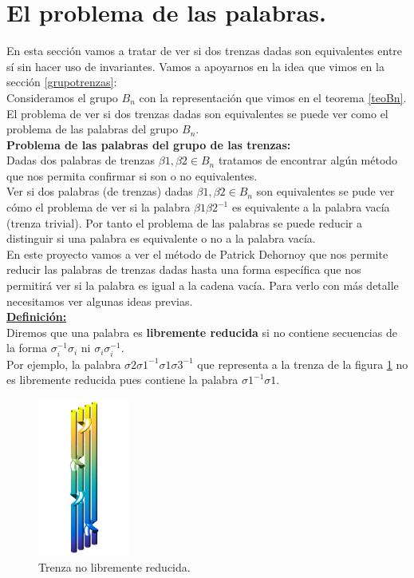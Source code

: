 \section{El problema de las palabras.}\label{deh}
En esta sección vamos a tratar de ver si dos trenzas dadas son equivalentes entre sí sin hacer uso de invariantes. Vamos a apoyarnos en la idea que vimos en la sección \ref{grupotrenzas}:\\

Consideramos el grupo $ B_{n} $ con la representación que vimos en el teorema \ref{teoBn}. El problema de ver si dos trenzas dadas son equivalentes se puede ver como el problema de las palabras del grupo $ B_{n} $.\\

\textbf{Problema de las palabras del grupo de las trenzas:}\\
Dadas dos palabras de trenzas $\beta1, \beta2 \in B_{n}$ tratamos de encontrar algún método que nos permita confirmar si son o no equivalentes. \\

Ver si dos palabras (de trenzas) dadas $\beta1, \beta2 \in B_{n}$ son equivalentes se pude ver cómo el problema de ver si la palabra $\beta1\beta2^{-1}$ es equivalente a la palabra vacía (trenza trivial). Por tanto el problema de las palabras se puede reducir a distinguir si una palabra es equivalente o no a la palabra vacía. \\

En este proyecto vamos a ver el método de Patrick Dehornoy que nos permite reducir las palabras de trenzas dadas hasta una forma específica que nos permitirá ver si la palabra es igual a la cadena vacía. Para verlo con más detalle necesitamos ver algunas ideas previas.\\

\underline{\textbf{Definición:}}\\
Diremos que una palabra es \textbf{libremente reducida} si no contiene secuencias de la forma $\sigma_{i}^{-1}\sigma_{i} $ ni $\sigma_{i}\sigma_{i}^{-1}$.\\

Por ejemplo, la palabra $\sigma2\sigma1^{-1}\sigma1\sigma3^{-1}$ que representa a la trenza de la figura \ref{deh1} no es libremente reducida pues contiene la palabra $\sigma1^{-1}\sigma1$.\\

	\begin{figure}[h!]
		\centering
		\includegraphics[width=3cm]{itrenzas/deh1.png}
		\caption{Trenza no libremente reducida.}
		\label{deh1} 
	\end{figure}

